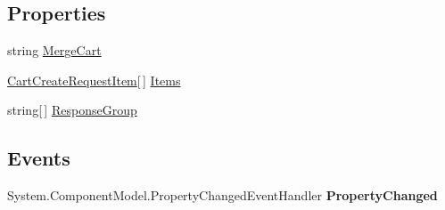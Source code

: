 \subsection*{Properties}
\begin{DoxyCompactItemize}
\item 
\hypertarget{class_price___comparison_1_1amazon_1_1ecs_1_1_cart_create_request_a35c1c1bf662aa89518be61c1f61026d1}{string \hyperlink{class_price___comparison_1_1amazon_1_1ecs_1_1_cart_create_request_a35c1c1bf662aa89518be61c1f61026d1}{Merge\-Cart}}\label{class_price___comparison_1_1amazon_1_1ecs_1_1_cart_create_request_a35c1c1bf662aa89518be61c1f61026d1}

\begin{DoxyCompactList}\small\item\em \end{DoxyCompactList}\item 
\hypertarget{class_price___comparison_1_1amazon_1_1ecs_1_1_cart_create_request_a4a82737150ed33fcb9477e69665f28ed}{\hyperlink{class_price___comparison_1_1amazon_1_1ecs_1_1_cart_create_request_item}{Cart\-Create\-Request\-Item}\mbox{[}$\,$\mbox{]} \hyperlink{class_price___comparison_1_1amazon_1_1ecs_1_1_cart_create_request_a4a82737150ed33fcb9477e69665f28ed}{Items}}\label{class_price___comparison_1_1amazon_1_1ecs_1_1_cart_create_request_a4a82737150ed33fcb9477e69665f28ed}

\begin{DoxyCompactList}\small\item\em \end{DoxyCompactList}\item 
\hypertarget{class_price___comparison_1_1amazon_1_1ecs_1_1_cart_create_request_a5e289abd7860f9db1f1316f0c07c3ef6}{string\mbox{[}$\,$\mbox{]} \hyperlink{class_price___comparison_1_1amazon_1_1ecs_1_1_cart_create_request_a5e289abd7860f9db1f1316f0c07c3ef6}{Response\-Group}}\label{class_price___comparison_1_1amazon_1_1ecs_1_1_cart_create_request_a5e289abd7860f9db1f1316f0c07c3ef6}

\begin{DoxyCompactList}\small\item\em \end{DoxyCompactList}\end{DoxyCompactItemize}
\subsection*{Events}
\begin{DoxyCompactItemize}
\item 
\hypertarget{class_price___comparison_1_1amazon_1_1ecs_1_1_cart_create_request_af16e1834b9945d912946d290f86178ee}{System.\-Component\-Model.\-Property\-Changed\-Event\-Handler {\bfseries Property\-Changed}}\label{class_price___comparison_1_1amazon_1_1ecs_1_1_cart_create_request_af16e1834b9945d912946d290f86178ee}

\end{DoxyCompactItemize}
